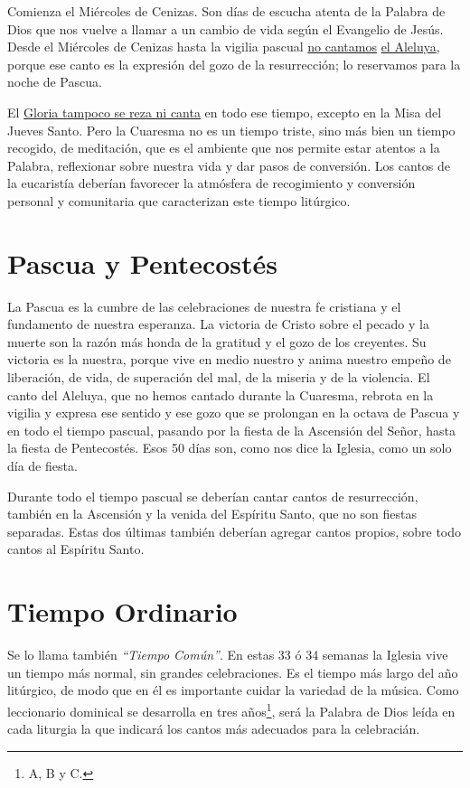 \documentclass[letterpaper, 12pt]{book}
\begin{document}
    Comienza el Mi\'ercoles de Cenizas. Son d\'ias de escucha atenta de la Palabra de Dios que nos vuelve a llamar a un cambio de vida seg\'un el Evangelio de Jes\'us. Desde el Mi\'ercoles de Cenizas hasta la vigilia pascual \underline{no cantamos} \underline{el Aleluya}, porque ese canto es la expresi\'on del gozo de la resurrecci\'on; lo reservamos para la noche de Pascua.\newline
    
    El \underline{Gloria tampoco se reza ni canta} en todo ese tiempo, excepto en la Misa del Jueves Santo. Pero la Cuaresma no es un tiempo triste, sino m\'as bien un tiempo recogido, de meditaci\'on, que es el ambiente que nos permite estar atentos a la Palabra, reflexionar sobre nuestra vida y dar pasos de conversi\'on. Los cantos de la eucarist\'ia deber\'ian favorecer la atm\'osfera de recogimiento y conversi\'on personal y comunitaria que caracterizan este tiempo lit\'urgico.
    
    \section{Pascua y Pentecost\'es}
    La Pascua es la cumbre de las celebraciones de nuestra fe cristiana y el fundamento de nuestra esperanza. La victoria de Cristo sobre el pecado y la muerte son la raz\'on m\'as honda de la gratitud y el gozo de los creyentes. Su victoria es la nuestra, porque vive en medio nuestro y anima nuestro empe\~no de liberaci\'on, de vida, de superaci\'on del mal, de la miseria y de la violencia. El canto del Aleluya, que no hemos cantado durante la Cuaresma, rebrota en la vigilia y expresa ese sentido y ese gozo que se prolongan en la octava de Pascua y en todo el tiempo pascual, pasando por la fiesta de la Ascensi\'on del Se\~nor, hasta la fiesta de Pentecost\'es. Esos 50 d\'ias son, como nos dice la Iglesia, como un solo d\'ia de fiesta.\newline
    
    Durante todo el tiempo pascual se deber\'ian cantar cantos de resurrecci\'on, tambi\'en en la Ascensi\'on y la venida del Esp\'iritu Santo, que no son fiestas separadas. Estas dos \'ultimas tambi\'en deber\'ian agregar cantos propios, sobre todo cantos al Esp\'iritu Santo.
    
    \section{Tiempo Ordinario}
    Se lo llama tambi\'en \textit{``Tiempo Com\'un''}. En estas 33 \'o 34 semanas la Iglesia vive un tiempo m\'as normal, sin grandes celebraciones. Es el tiempo m\'as largo del a\~no lit\'urgico, de modo que en \'el es importante cuidar la variedad de la m\'usica. Como leccionario dominical se desarrolla en tres a\~nos\footnote{A, B y C.}, ser\'a la Palabra de Dios le\'ida en cada liturgia la que indicar\'a los cantos m\'as adecuados para la celebraci\'an.\newline
    
\end{document}
